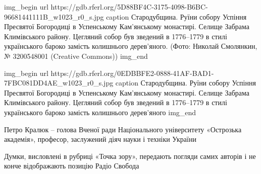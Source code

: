 \ifcmt
img_begin 
	url https://gdb.rferl.org/5D88BF4C-3175-4098-B6BC-96681441111B_w1023_r0_s.jpg
	caption Стародубщина. Руїни собору Успіння Пресвятої Богородиці в Успенському Кам'янському монастирі. Селище Забрама Климівського району. Цегляний собор був зведений в 1776–1779 в стилі українського бароко замість колишнього дерев'яного. (Фото: Николай Смолянкин, № 3200548001 (Creative Commons))
img_end
\fi

\ifcmt
img_begin 
	url https://gdb.rferl.org/0EDBBFE2-0888-41AF-BAD1-7FBC081DD4AE_w1023_r0_s.jpg
	caption Стародубщина. Руїни собору Успіння Пресвятої Богородиці в Успенському Кам'янському монастирі. Селище Забрама Климівського району. Цегляний собор був зведений в 1776–1779 в стилі українського бароко замість колишнього дерев'яного
img_end
\fi

Петро Кралюк – голова Вченої ради Національного університету «Острозька
академія», професор, заслужений діяч науки і техніки України

Думки, висловлені в рубриці «Точка зору», передають погляди самих авторів і не
конче відображають позицію Радіо Свобода

